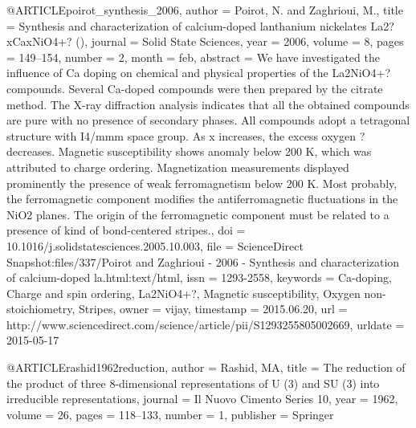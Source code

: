 @ARTICLE{poirot_synthesis_2006,
  author = {Poirot, N. and Zaghrioui, M.},
  title = {Synthesis and characterization of calcium-doped lanthanium nickelates
	{La}2?{xCaxNiO}4+? ()},
  journal = {Solid State Sciences},
  year = {2006},
  volume = {8},
  pages = {149--154},
  number = {2},
  month = feb,
  abstract = {We have investigated the influence of Ca doping on chemical and physical
	properties of the La2NiO4+? compounds. Several Ca-doped compounds
	were then prepared by the citrate method. The X-ray diffraction analysis
	indicates that all the obtained compounds are pure with no presence
	of secondary phases. All compounds adopt a tetragonal structure with
	I4/mmm space group. As x increases, the excess oxygen ? decreases.
	Magnetic susceptibility shows anomaly below 200 K, which was attributed
	to charge ordering. Magnetization measurements displayed prominently
	the presence of weak ferromagnetism below 200 K. Most probably, the
	ferromagnetic component modifies the antiferromagnetic fluctuations
	in the NiO2 planes. The origin of the ferromagnetic component must
	be related to a presence of kind of bond-centered stripes.},
  doi = {10.1016/j.solidstatesciences.2005.10.003},
  file = {ScienceDirect Snapshot:files/337/Poirot and Zaghrioui - 2006 - Synthesis and characterization of calcium-doped la.html:text/html},
  issn = {1293-2558},
  keywords = {Ca-doping, Charge and spin ordering, La2NiO4+?, Magnetic susceptibility,
	Oxygen non-stoichiometry, Stripes},
  owner = {vijay},
  timestamp = {2015.06.20},
  url = {http://www.sciencedirect.com/science/article/pii/S1293255805002669},
  urldate = {2015-05-17}
}

@ARTICLE{rashid1962reduction,
  author = {Rashid, MA},
  title = {The reduction of the product of three 8-dimensional representations
	of U (3) and SU (3) into irreducible representations},
  journal = {Il Nuovo Cimento Series 10},
  year = {1962},
  volume = {26},
  pages = {118--133},
  number = {1},
  publisher = {Springer}
}

